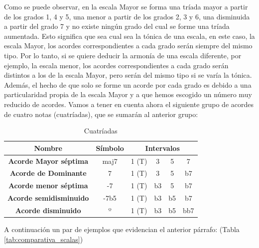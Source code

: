     Como se puede observar, en la escala Mayor se forma una tríada mayor a partir de los grados 1, 4 y 5, una menor a partir de los grados 2, 3 y 6, una disminuida a partir del grado 7 y no existe ningún grado del cual se forme una tríada aumentada. Esto significa que sea cual sea la tónica de una escala, en este caso, la escala Mayor, los acordes correspondientes a cada grado serán siempre del mismo tipo. Por lo tanto, si se quiere deducir la armonía de una escala diferente, por ejemplo, la escala menor, los acordes correspondientes a cada grado serán distintos a los de la escala Mayor, pero serán del mismo tipo si se varía la tónica. Además, el hecho de que solo se forme un acorde por cada grado es debido a una particularidad propia de la escala Mayor y a que hemos escogido un número muy reducido de acordes. Vamos a tener en cuenta ahora el siguiente grupo de acordes de cuatro notas (cuatríadas), que se sumarán al anterior grupo:

\begin{table}[h]
    \centering
    \begin{tabular}{c|c|c|c|c|c}       
        \textbf{Nombre} & \textbf{Símbolo} & \multicolumn{4}{c}{\textbf{Intervalos}} \\
        \hline
        \hline
        \textbf{Acorde Mayor séptima} & maj7 & 1 (T) & 3 & 5 & 7\\
        \hline
        \textbf{Acorde de Dominante} & 7 & 1 (T) & 3 & 5 & b7\\
        \hline
        \textbf{Acorde menor séptima} & -7 & 1 (T) & b3 & 5 & b7 \\
        \hline
        \textbf{Acorde semidisminuido} & -7b5 & 1 (T) & b3 & b5 & b7 \\
        \hline
        \textbf{Acorde disminuido} & º & 1 (T) & b3 & b5 & bb7 \\
    \end{tabular}
    \caption{Cuatríadas}
    \label{tab:cuatriads}
\end{table}

    A continuación un par de ejemplos que evidencian el anterior párrafo: (Tabla \ref{tab:comparativa_scalas})

